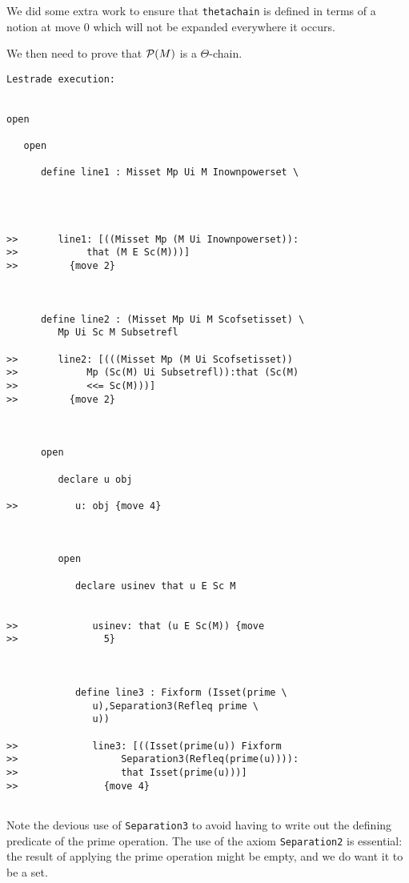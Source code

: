\documentclass[12pt]{article}
\begin{document}
We did some extra work to ensure that {\tt thetachain} is defined in terms of a notion at move 0 which will not be expanded everywhere it occurs.

We then need to prove that ${\cal P}(M)$ is a $\Theta$-chain.

\begin{verbatim}Lestrade execution:


open

   open

      define line1 : Misset Mp Ui M Inownpowerset \
         



>>       line1: [((Misset Mp (M Ui Inownpowerset)):
>>            that (M E Sc(M)))]
>>         {move 2}



      define line2 : (Misset Mp Ui M Scofsetisset) \
         Mp Ui Sc M Subsetrefl

>>       line2: [(((Misset Mp (M Ui Scofsetisset))
>>            Mp (Sc(M) Ui Subsetrefl)):that (Sc(M)
>>            <<= Sc(M)))]
>>         {move 2}



      open

         declare u obj

>>          u: obj {move 4}



         open

            declare usinev that u E Sc M


>>             usinev: that (u E Sc(M)) {move
>>               5}



            define line3 : Fixform (Isset(prime \
               u),Separation3(Refleq prime \
               u))

>>             line3: [((Isset(prime(u)) Fixform
>>                  Separation3(Refleq(prime(u)))):
>>                  that Isset(prime(u)))]
>>               {move 4}


\end{verbatim}

Note the devious use of {\tt Separation3} to avoid having to write out the defining predicate of the prime operation.  The use of the axiom
{\tt Separation2} is essential:  the result of applying the prime operation might be empty, and we do want it to be a set.
\end{document}
